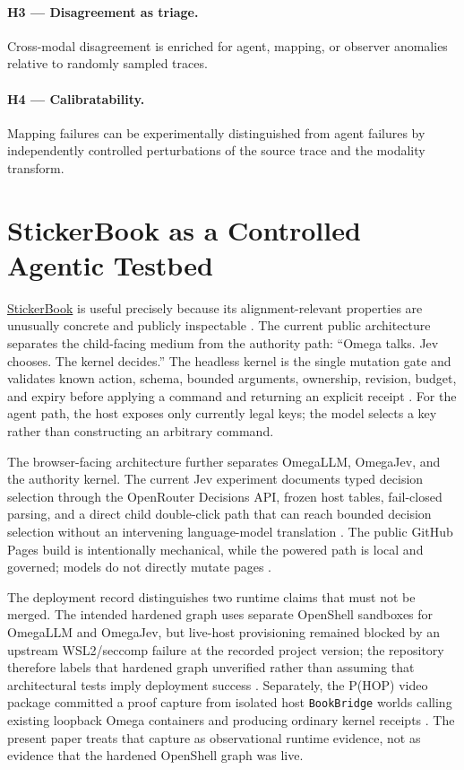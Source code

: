 \documentclass[11pt]{article}
\begin{document}
\paragraph{H3 --- Disagreement as triage.}
Cross-modal disagreement is enriched for agent, mapping, or observer anomalies relative to randomly sampled traces.

\paragraph{H4 --- Calibratability.}
Mapping failures can be experimentally distinguished from agent failures by independently controlled perturbations of the source trace and the modality transform.

\section{StickerBook as a Controlled Agentic Testbed}
\href{https://github.com/PaulTiffany/stickerbook}{StickerBook} is useful precisely because its alignment-relevant properties are unusually concrete and publicly inspectable \citep{tiffany2026stickerbook}. The current public architecture separates the child-facing medium from the authority path: ``Omega talks. Jev chooses. The kernel decides.'' The headless kernel is the single mutation gate and validates known action, schema, bounded arguments, ownership, revision, budget, and expiry before applying a command and returning an explicit receipt \citep{tiffany2026stickerbookcore}. For the agent path, the host exposes only currently legal keys; the model selects a key rather than constructing an arbitrary command.

The browser-facing architecture further separates OmegaLLM, OmegaJev, and the authority kernel. The current Jev experiment documents typed decision selection through the OpenRouter Decisions API, frozen host tables, fail-closed parsing, and a direct child double-click path that can reach bounded decision selection without an intervening language-model translation \citep{tiffany2026stickerbookjev,tiffany2026stickerbookinterface}. The public GitHub Pages build is intentionally mechanical, while the powered path is local and governed; models do not directly mutate pages \citep{tiffany2026stickerbook}.

The deployment record distinguishes two runtime claims that must not be merged. The intended hardened graph uses separate OpenShell sandboxes for OmegaLLM and OmegaJev, but live-host provisioning remained blocked by an upstream WSL2/seccomp failure at the recorded project version; the repository therefore labels that hardened graph unverified rather than assuming that architectural tests imply deployment success \citep{tiffany2026stickerbookruntime}. Separately, the P(HOP) video package committed a proof capture from isolated host \texttt{BookBridge} worlds calling existing loopback Omega containers and producing ordinary kernel receipts \citep{tiffany2026stickerbookproof,tiffany2026stickerbookvideo}. The present paper treats that capture as observational runtime evidence, not as evidence that the hardened OpenShell graph was live.
\end{document}
